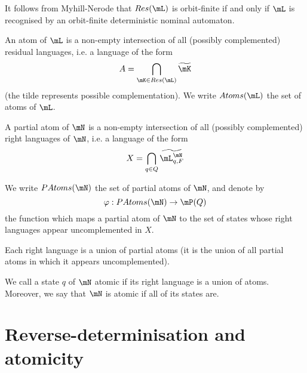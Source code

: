 \documentclass[a4paper, UKenglish, cleveref, autoref, numberwithinsect]{lipics-modified}
\newcommand{\Res}{\mathsf{Res}}
\newcommand{\Atoms}{\mathsf{Atoms}}
\newcommand{\PAtoms}{\mathsf{PAtoms}}
\begin{document}
\begin{note*}

It follows from Myhill-Nerode that $\Res(\mL)$ is orbit-finite if and only if $\mL$ is recognised by an orbit-finite deterministic nominal automaton.

\end{note*}

\begin{definition}

An atom of $\mL$ is a non-empty intersection of all (possibly complemented) residual languages, i.e. a language of the form $$A=\bigcap_{\mK\in\Res(\mL)}\widetilde{\mK}$$ (the tilde represents possible complementation). We write $\Atoms(\mL)$ the set of atoms of $\mL$.

\end{definition}

\begin{definition}

A partial atom of $\mN$ is a non-empty intersection of all (possibly complemented) right languages of $\mN$, i.e. a language of the form $$X=\bigcap_{q\in Q}\widetilde{\mL_{q,F}^\mN}$$

We write $\PAtoms(\mN)$ the set of partial atoms of $\mN$, and denote by $$\varphi:\PAtoms(\mN)\to \mP(Q)$$ the function which maps a partial atom of $\mN$ to the set of states whose right languages appear uncomplemented in $X$.

\end{definition}

\begin{note*}

Each right language is a union of partial atoms (it is the union of all partial atoms in which it appears uncomplemented).

\end{note*}

\begin{definition}

We call a state $q$ of $\mN$ atomic if its right language is a union of atoms. Moreover, we say that $\mN$ is atomic if all of its states are.

\end{definition}

\section{Reverse-determinisation and atomicity}\label{sec2}
\end{document}
